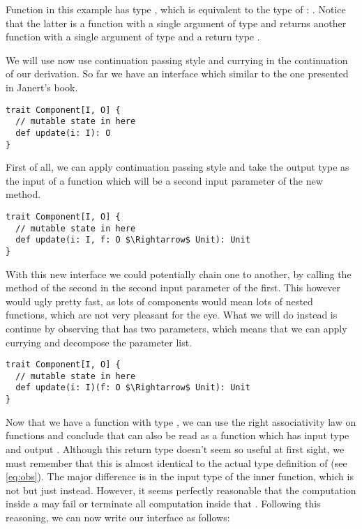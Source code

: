 Function  in this example has type , which is equivalent to the type of : . Notice that the latter is a function with a single argument of type  and returns another function with a single argument of type  and a return type .

We will use now use continuation passing style and currying in the continuation of our derivation. So far we have an interface which similar to the one presented in Janert's book.

\begin{lstlisting}[style=InlineScalaStyle]
trait Component[I, O] {
  // mutable state in here
  def update(i: I): O
}
\end{lstlisting}

First of all, we can apply continuation passing style and take the output type  as the input of a function which will be a second input parameter of the new  method.

\begin{lstlisting}[style=InlineScalaStyle]
trait Component[I, O] {
  // mutable state in here
  def update(i: I, f: O $\Rightarrow$ Unit): Unit
}
\end{lstlisting}

With this new interface we could potentially chain one \comp to another, by calling the  method of the second \comp in the second input parameter of the first. This however would ugly pretty fast, as lots of components would mean lots of nested functions, which are not very pleasant for the eye. What we will do instead is continue by observing that  has two parameters, which means that we can apply currying and decompose the parameter list.

\begin{lstlisting}[style=InlineScalaStyle]
trait Component[I, O] {
  // mutable state in here
  def update(i: I)(f: O $\Rightarrow$ Unit): Unit
}
\end{lstlisting}

Now that we have a function  with type , we can use the right associativity law on functions and conclude that  can also be read as a function which has input type  and output . Although this return type doesn't seem so useful at first sight, we must remember that this is almost identical to the actual type definition of \obs (see \cref{eq:obs}). The major difference is in the input type of the inner function, which is not  but just  instead. However, it seems perfectly reasonable that the computation inside a \comp may fail or terminate all computation inside that \comp. Following this reasoning, we can now write our interface as follows:

